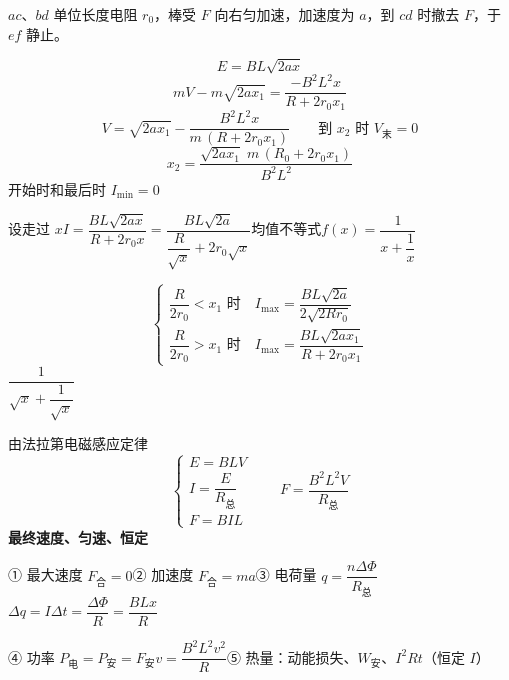\begin{problem}
$ac$、$bd$ 单位长度电阻 $r_0$，棒受 $F$ 向右匀加速，加速度为 $a$，到 $cd$ 时撤去 $F$，于 $ef$ 静止。
\begin{solution}
\[ E=BL\sqrt{2ax} \]
\[ mV-m\sqrt{2ax_1}=\frac{-B^2L^2x}{R+2r_0x_1} \]
\[ V=\sqrt{2ax_1}-\frac{B^2L^2x}{m\,(R+2r_0x_1)}\qquad \text{到 }x_2\text{ 时 }V_{\text{末}}=0 \]
\[ x_2=\frac{\sqrt{2ax_1}\;m\,(R_0+2r_0x_1)}{B^2L^2} \] %
开始时和最后时 $I_{\min}=0$

设走过 $x$\quad $I=\dfrac{BL\sqrt{2ax}}{R+2r_0x}=\dfrac{BL\sqrt{2a}}{\dfrac{R}{\sqrt{x}}+2r_0\sqrt{x}}$\quad 均值不等式\quad $f(x)=\dfrac{1}{x+\dfrac{1}{x}}$

\[ \left\{\begin{array}{l}
\dfrac{R}{2r_0}<x_1\text{ 时}\quad I_{\max}=\dfrac{BL\sqrt{2a}}{2\sqrt{2Rr_0}}\\[3ex]
\dfrac{R}{2r_0}>x_1\text{ 时}\quad I_{\max}=\dfrac{BL\sqrt{2ax_1}}{R+2r_0x_1}
\end{array}\right. \]
$\dfrac{1}{\sqrt{x}+\dfrac{1}{\sqrt{x}}}$
\end{solution}
\end{problem}
由法拉第电磁感应定律
\[ \left\{\begin{array}{l} E=BLV\\ I=\dfrac{E}{R_{\text{总}}}\\ F=BIL\end{array}\right.\qquad F=\frac{B^2L^2V}{R_{\text{总}}} \]
\textbf{最终速度、匀速、恒定}

① 最大速度 $F_{\text{合}}=0$\quad ② 加速度 $F_{\text{合}}=ma$\quad ③ 电荷量 $q=\dfrac{n\Delta\Phi}{R_{\text{总}}}$\qquad $\Delta q=I\Delta t=\dfrac{\Delta\Phi}{R}=\dfrac{BLx}{R}$

④ 功率 $P_{\text{电}}=P_{\text{安}}=F_{\text{安}}v=\dfrac{B^2L^2v^2}{R}$\quad ⑤ 热量：动能损失、$W_{\text{安}}$、$I^2Rt$（恒定 $I$）

